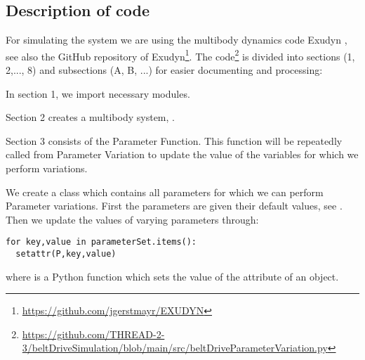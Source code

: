 \subsection{Description of code}
For simulating the system we are using the multibody dynamics code Exudyn \cite{Exudyn2023}, see also the GitHub repository of Exudyn\footnote{\url{https://github.com/jgerstmayr/EXUDYN}}.
%
The code\footnote{\url{https://github.com/THREAD-2-3/beltDriveSimulation/blob/main/src/beltDriveParameterVariation.py}} is divided into sections (1, 2,..., 8) and subsections (A, B, ...) for easier documenting and processing: %
\bi 
\item{In section 1, we import necessary modules.}
\item{Section 2 creates a multibody system, .}
\item{Section 3 consists of the Parameter Function. This function will be repeatedly called from Parameter Variation to update the value of the variables for which we perform variations.} 
\bi
\item{
We create a class  which contains all parameters for which we can perform Parameter variations. First the parameters are given their default values, see . Then we update the values of varying parameters through:
\pythonstyle
\begin{tcolorbox}\begin{lstlisting}
for key,value in parameterSet.items():
  setattr(P,key,value)
\end{lstlisting}\end{tcolorbox}		
where  is a Python function which sets the value of the attribute of an object.}
%
